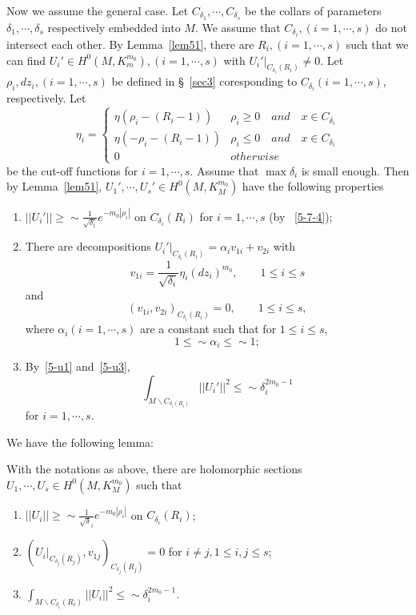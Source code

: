 Now we assume the general case. Let $C_{\delta_1},\cdots, C_{\delta_s}$ be
the collars of parameters $\delta_1,\cdots, \delta_s$ respectively
embedded
into $M$. We assume that $C_{\delta_i}, (i=1,\cdots, s)$ do not intersect
each other.
By Lemma~\ref{lem51}, there are $R_i, (i=1,\cdots, s)$ such that we can
find
$U_i'\in H^0(M,K_m^{m_0}), (i=1,\cdots, s)$ with
$U_i'|_{C_{\delta_i}(R_i)}\neq 0$. Let $\rho_i, dz_i, (i=1,\cdots, s)$ be
defined in \S~\ref{sec3}
coresponding to $C_{\delta_i} (i=1,\cdots, s)$, respectively. Let
\[
\eta_i=
\left\{
\begin{array}{ll}
\eta(\rho_i-(R_i-1)) &\rho_i\geq 0\quad and\quad x\in C_{\delta_i}\\
\eta(-\rho_i-(R_i-1)) &\rho_i\leq 0\quad and\quad x\in C_{\delta_i}\\
0 & otherwise
\end{array}
\right.
\]
be the cut-off functions for $i=1,\cdots, s$. Assume that $\max \delta_i$
is small enough.
Then
by Lemma~\ref{lem51}, $U_1',\cdots, U_s'\in H^0(M,K_M^{m_0})$
have  the following properties 
\begin{enumerate}
\item $||U_i'||\geq\sim\frac{1}{\sqrt{\delta_i}}e^{-m_0|\rho_i|}$ on
$C_{\delta_i}(R_i)$ for $i=1,\cdots, s$ 
(by ~\eqref{5-7-4});
\item
There are decompositions 
 $U_i'|_{C_{\delta_i}(R_i)}=\alpha_iv_{1i}+v_{2i}$ with
\begin{equation}\label{vj}
v_{1i}=\frac{1}{\sqrt{\delta_i}}\eta_i(dz_i)^{m_0},\qquad
1\leq i\leq s
\end{equation}
and
\[
(v_{1i},v_{2i})_{C_{\delta_i}(R_i)}=0, \qquad 1\leq i\leq s,
\]
where $\alpha_i (i=1,\cdots,s)$ are a constant such that for
$1\leq i\leq s$,
\begin{equation}\label{vj1}
1\leq\sim\alpha_i\leq\sim 1;
\end{equation}
\item By~\eqref{5-u1} and~\eqref{5-u3},
\begin{equation}\label{5-7-5}
\int_{M\backslash C_{\delta_i(R_i)}}||U_i'||^2\leq\sim \delta_i^{2m_0-1}
\end{equation}
for $i=1,\cdots, s$.
\end{enumerate}

We have the following lemma:

\begin{lemma}\label{lem531}
With the notations as above,
there are holomorphic sections $U_1,\cdots, U_s\in 
H^0(M,K_M^{m_0})$ such that
\begin{enumerate}
\item $||U_i||\geq\sim \frac{1}{\sqrt\delta_i}e^{-m_0|\rho_i|}$ on 
$C_{\delta_i}(R_i)$;
\item $(U_i|_{C_{\delta_j}(R_j)},v_{1j})_{C_{\delta_j}(R_j)}=0$ for $i\neq
j, 1\leq i,j\leq
s$;
\item $\int_{M\backslash
C_{\delta_i}(R_i)}||U_i||^2\leq\sim
\delta_i^{2m_0-1}$.
\end{enumerate}
\end{lemma}

